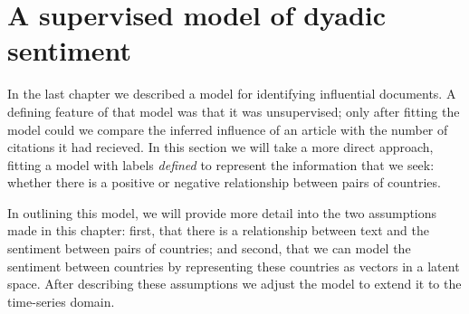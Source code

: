 \section{A supervised model of dyadic sentiment}

\label{section:foreign_relations_supervised_model}

In the last chapter we described a model for identifying influential
documents.  A defining feature of that model was that it was
unsupervised; only after fitting the model could we compare the
inferred influence of an article with the number of citations it had
recieved.  In this section we will take a more direct approach,
fitting a model with labels \emph{defined} to represent the
information that we seek: whether there is a positive or negative
relationship between pairs of countries.

In outlining this model, we will provide more detail into the two
assumptions made in this chapter: first, that there is a relationship
between text and the sentiment between pairs of countries; and second,
that we can model the sentiment between countries by representing
these countries as vectors in a latent space.  After describing these
assumptions we adjust the model to extend it to the time-series
domain.

